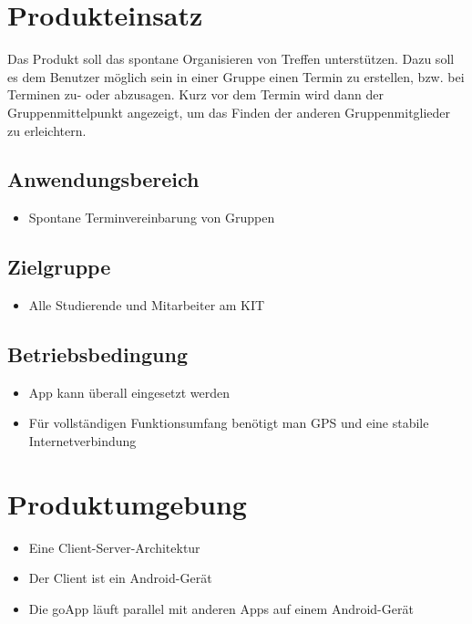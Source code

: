 \documentclass{scrartcl}
\begin{document}
	\section{Produkteinsatz}
	\begin{itemize}	        
		Das Produkt soll das spontane Organisieren von Treffen unterstützen. Dazu soll es dem Benutzer möglich sein in einer Gruppe einen Termin zu erstellen, bzw. bei Terminen zu- oder abzusagen. \newline
		Kurz vor dem Termin wird dann der Gruppenmittelpunkt angezeigt, um das Finden der anderen Gruppenmitglieder zu erleichtern.
	\end{itemize}
	\subsection{Anwendungsbereich}
	\begin{itemize}	        
		\item Spontane Terminvereinbarung von Gruppen
	\end{itemize}
	\subsection{Zielgruppe}
	\begin{itemize}	        
		\item Alle Studierende und Mitarbeiter am KIT
	\end{itemize}
	\subsection{Betriebsbedingung}
	\begin{itemize}	        
		\item App kann überall eingesetzt werden
		\item Für vollständigen Funktionsumfang benötigt man GPS und eine stabile Internetverbindung
	\end{itemize}
	
	\newpage
	
	
	\section{Produktumgebung}
	\begin{itemize}	        
		\item Eine \gls{Client-Server-Architektur}
		\item Der \gls{Client} ist ein Android-Gerät
		\item Die goApp läuft parallel mit anderen Apps auf einem Android-Gerät
	\end{itemize}
\end{document}
